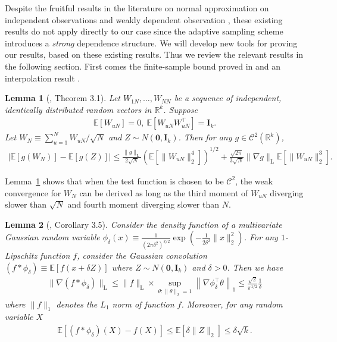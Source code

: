 \documentclass[12pt]{article}
\newtheorem{lemma}{Lemma}
\newcommand{\E}{\mathbb E}								%
\begin{document}
Despite the fruitful results in the literature on normal approximation on independent observations \citep{chatterjee2008multivariate} and weakly dependent observation \citet{chen2004normal}, these existing results do not apply directly to our case since the adaptive sampling scheme introduces a \textit{strong} dependence structure. We will develop new tools for proving our results, based on these existing results. Thus we review the relevant results in the following section. First comes the finite-sample bound proved in \citet{chatterjee2008multivariate} and an interpolation result \citet{Meckes2009}.



\begin{lemma}[\citet{chatterjee2008multivariate}, Theorem 3.1]\label{lem:CLT_BL_distance}
	Let $W_{1N},\ldots, W_{NN}$ be a sequence of independent, identically distributed random vectors in $\mathbb{R}^k$. Suppose
	\begin{align*}
		\E[W_{uN}]=0,\ \E[W_{uN}W_{uN}^\top ]=\bm I_{k}.
	\end{align*}
	Let $W_N\equiv \sum_{u=1}^N W_{uN}/\sqrt{N}$ and $Z\sim N(\bm 0,\bm I_k)$. Then for any $g\in\mathcal{C}^2(\mathbb{R}^k)$,
	\begin{align*}
		\left|\E[g(W_N)]-\E[g(Z)]\right|\leq \frac{\|g\|_{\mathrm{L}}}{2\sqrt{N}}(\E[\|W_{uN}\|_2^4])^{1/2}+\frac{\sqrt{2\pi}}{3\sqrt{N}}\|\nabla g\|_{\mathrm{L}}\E[\|W_{uN}\|_2^3].
	\end{align*}
\end{lemma}

\noindent Lemma~\ref{lem:CLT_BL_distance} shows that when the test function is chosen to be $\mathcal{C}^2$, the weak convergence for $W_N$ can be derived as long as the third moment of $W_{uN}$ diverging slower than $\sqrt{N}$ and fourth moment diverging slower than $N$. 

\begin{lemma}[\citet{Meckes2009}, Corollary 3.5]\label{lem:smoothing}
	Consider the density function of a multivariate Gaussian random variable $\phi_{\delta}(x)\equiv \frac{1}{(2\pi \delta^2)^{k/2}}\exp\left(-\frac{1}{2\delta^2}\|x\|_2^2\right)$. For any $1$-Lipschitz function $f$, consider the Gaussian convolution $(f*\phi_{\delta})\equiv \E[f(x+\delta Z)]$ where $Z\sim N(\bm0,\bm I_k)$ and $\delta>0$. Then we have 
	\begin{align*}
		\|\nabla (f*\phi_{\delta})\|_{\mathrm{L}}\leq \|f\|_{\mathrm{L}}\times \sup_{\theta:\|\theta\|_2=1}\left\|\nabla \phi_{\delta}^\top\theta\right\|_1\leq \frac{\sqrt{2}}{\pi^{1/2}}\frac{1}{\delta}
	\end{align*}
	where $\|f\|_1$ denotes the $L_1$ norm of function $f$. Moreover, for any random variable $X$
	\begin{align*}
		\E[(f*\phi_{\delta})(X)-f(X)]\leq \E[\delta\|Z\|_2]\leq \delta\sqrt{k}.
	\end{align*}
\end{lemma}
\end{document}
